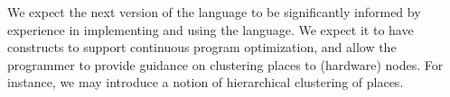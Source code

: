 We expect the next version of the language to be significantly
informed by experience in implementing and using the language. We
expect it to have constructs to support continuous program
optimization, and allow the programmer to provide guidance on
clustering places to (hardware) nodes. For instance, we may introduce
a notion of hierarchical clustering of places.




